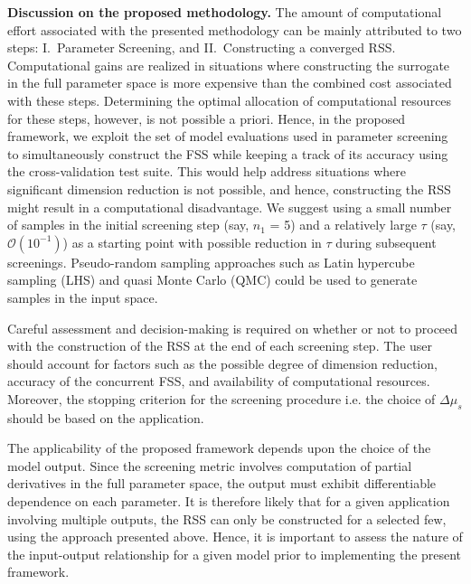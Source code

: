 \textbf{Discussion on the proposed methodology.}
The amount of computational effort associated with the presented methodology
can be mainly attributed to two steps: I.~Parameter Screening, and 
II.~Constructing a converged RSS. Computational gains are realized in situations
where constructing the surrogate in the full parameter space is more expensive
than the combined cost associated with these steps. Determining the optimal
allocation of computational resources for these steps, however, is not possible
a priori. Hence, in the proposed framework, we exploit the set of model
evaluations used in parameter screening to simultaneously construct the FSS
while keeping a track of its accuracy using the cross-validation test suite.
This would help address situations where significant dimension reduction 
is not possible, and hence, constructing the RSS might result in a 
computational
disadvantage. We suggest using a small number of samples in the initial
screening step (say, $n_1$ = 5) and a relatively large $\tau$ (say,
$\mathcal{O}(10^{-1})$) as a starting point with possible reduction in $\tau$
during subsequent screenings. Pseudo-random sampling approaches such as
Latin hypercube sampling (LHS) and quasi Monte Carlo (QMC) could be used to
generate samples in the input space.

Careful assessment and decision-making is required on whether or not to
proceed with the construction of the RSS at the end of each screening step.
The user should account for factors such as the possible degree of 
dimension reduction, accuracy of the concurrent FSS, and availability of
computational resources. Moreover, the stopping criterion for the
screening procedure i.e. the choice of $\Delta\mu_s$
should be based on the application. 

The applicability of the proposed framework depends upon the choice of the
model output.  Since the screening metric involves computation of partial
derivatives in the full parameter space, the output must exhibit differentiable
dependence on each parameter. It is therefore likely that for a given
application involving multiple outputs, the RSS can only be constructed for a
selected few, using the approach presented above.  Hence, it is important to
assess the nature of the input-output relationship for a given model prior to
implementing the present framework. 

